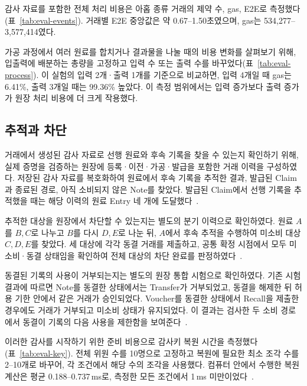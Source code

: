 감사 자료를 포함한 전체 처리 비용은 아홉 종류 거래의
제약 수, gas, E2E로 측정했다(표~\ref{tab:eval-events}).
거래별 E2E 중앙값은 약 0.67--1.50초였으며,
gas는 534,277--3,577,414였다.


가공 과정에서 여러 원료를 합치거나 결과물을 나눌 때의 비용 변화를
살펴보기 위해, 입출력에 배분하는 총량을 고정하고 입력 수 또는
출력 수를 바꾸었다(표~\ref{tab:eval-process}).
이 실험의 입력 2개·출력 1개를 기준으로 비교하면,
입력 4개일 때 gas는 6.41\%, 출력 3개일 때는 99.36\% 높았다.
이 측정 범위에서는 입력 증가보다 출력 증가가 원장 처리 비용에
더 크게 작용했다.


\subsection{추적과 차단}
\label{sec:eval-trace}

거래에서 생성된 감사 자료로 선행 원료와 후속 기록을 찾을 수 있는지
확인하기 위해, 실제 증명을 검증하는 원장에 등록·이전·가공·발급을
포함한 거래 이력을 구성하였다. 저장된 감사 자료를 복호화하여
원료에서 후속 기록을 추적한 결과, 발급된 Claim과 종료된 경로,
아직 소비되지 않은 Note를 찾았다. 발급된 Claim에서 선행 기록을
추적했을 때는 해당 이력의 원료 Entry 네 개에 도달했다~\cite{
zkdpp-m1hf-execution-2026}.

추적한 대상을 원장에서 차단할 수 있는지는 별도의 분기 이력으로
확인하였다. 원료 $A$를 $B,C$로 나누고 $B$를 다시 $D,E$로 나눈 뒤,
$A$에서 후속 추적을 수행하여 미소비 대상 $C,D,E$를 찾았다.
세 대상에 각각 동결 거래를 제출하고, 공통 확정 시점에서 모두
미소비·동결 상태임을 확인하여 전체 대상의 차단 완료를 판정하였다~\cite{
zkdpp-m1hf-execution-2026}.

동결된 기록의 사용이 거부되는지는 별도의 원장 통합 시험으로
확인하였다. 기존 시험 결과에 따르면 Note를 동결한 상태에서는
Transfer가 거부되었고, 동결을 해제한 뒤 허용 기한 안에서 같은
거래가 승인되었다. Voucher를 동결한 상태에서 Recall을 제출한
경우에도 거래가 거부되고 미소비 상태가 유지되었다. 이 결과는
검사한 두 소비 경로에서 동결이 기록의 다음 사용을 제한함을 보여준다~\cite{
zkdpp-m1hf-execution-2026}.

이러한 감사를 시작하기 위한 준비 비용으로 감사키 복원 시간을
측정했다(표~\ref{tab:eval-key}). 전체 위원 수를 10명으로 고정하고
복원에 필요한 최소 조각 수를 2--10개로 바꾸어,
각 조건에서 해당 수의 조각을 사용했다.
컴퓨터 안에서 수행한 복원 계산은 평균 0.188--0.737\,ms로,
측정한 모든 조건에서 1\,ms 미만이었다~\cite{zkdpp-evaluation-data-2026}.


